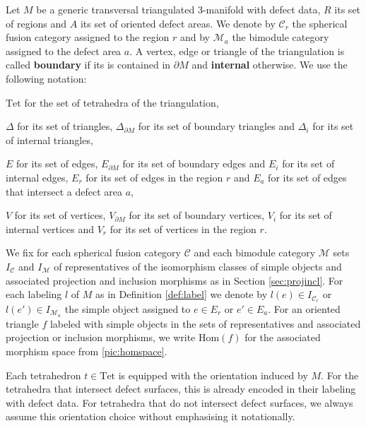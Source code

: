 \documentclass[1.5pt, a4paper]{article}
\newcommand{\mac}{\mathcal C}
\newcommand{\mam}{\mathcal M}
\newcommand{\Hom}{\mathrm{Hom}}
\begin{document}
Let $M$ be a generic transversal triangulated 3-manifold with defect data, $R$ its set of regions and $A$ its set of oriented defect areas.  We denote by $\mac_r$ the spherical fusion category assigned to the region $r$ and  by $\mam_a$ the bimodule category assigned to the defect area $a$. A vertex, edge or triangle of the triangulation is called {\bf boundary} if its is contained
 in $\partial M$ and  {\bf internal} otherwise. 
We use the following notation:
\begin{compactitem}
\item $\mathrm{Tet}$ for the set of tetrahedra of the triangulation, 
\item $\Delta$ for its set of triangles, $\Delta_{\partial M}$ for its set of boundary triangles and $\Delta_{i}$ for its set of internal triangles,
\item $E$ for its set of edges, $E_{\partial M}$ for its set of boundary edges and $E_{i}$ for its set of internal edges, $E_r$ for  its set of edges  in the region $r$ and $E_a$ for its set of edges that intersect a defect area $a$,
\item $V$ for its set of vertices, $V_{\partial M}$ for its set of boundary vertices,  $V_{i}$ for its set of internal vertices and $V_r$ for its set of vertices  in the region $r$.  
\end{compactitem}
 

We fix for each spherical fusion category $\mac$ and each bimodule category $\mam$ sets $I_{\mac}$ and $I_{\mam}$ of representatives of the isomorphism classes of simple objects and
associated projection and inclusion morphisms  as  in Section \ref{sec:projincl}.  
For each labeling $l$ of $M$  as in Definition \ref{def:label} 
 we denote by $l(e)\in I_{\mac_r}$ or $l(e')\in I_{\mam_a}$ the simple object assigned to  $e\in E_r$ or $e'\in E_a$. For an oriented triangle $f$ labeled with simple objects in the sets of representatives and associated projection or inclusion morphisms, we write $\Hom(f)$ for the associated morphism space from \eqref{pic:homspace}.

Each tetrahedron $t\in \mathrm{Tet}$ is equipped with the orientation induced by $M$. For the tetrahedra that intersect defect surfaces, this is already encoded in their labeling with defect data. For  tetrahedra that do not intersect defect surfaces, we always assume this orientation choice without emphasising it notationally. 
 
\end{document}

